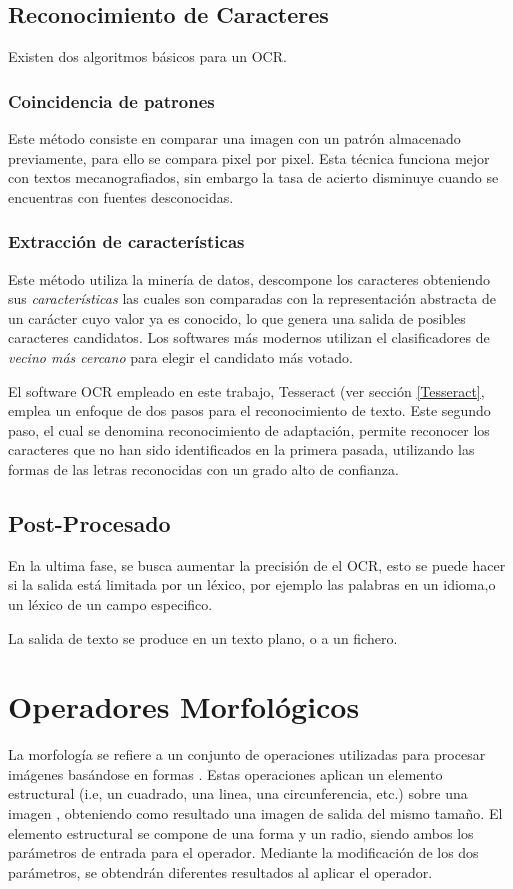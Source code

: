 \subsection{Reconocimiento de Caracteres}

Existen dos algoritmos básicos para un OCR.

\subsubsection{Coincidencia de patrones}
Este método consiste en comparar una imagen con un patrón almacenado previamente, para ello se compara pixel por pixel.
Esta técnica funciona mejor con textos mecanografiados, sin embargo la tasa de acierto disminuye  cuando se encuentras con fuentes desconocidas.
\subsubsection{Extracción de características}
Este método utiliza la minería de datos, descompone los caracteres obteniendo sus \textit{características} las cuales son comparadas con la representación abstracta de un carácter cuyo valor ya es conocido, lo que genera una salida de posibles  caracteres candidatos.
Los softwares más modernos utilizan el clasificadores de \textit{vecino más cercano} para elegir el candidato más votado.

El software OCR empleado en este trabajo, Tesseract (ver sección \ref{Tesseract}, emplea un enfoque de dos pasos para el reconocimiento de texto.
Este segundo paso, el cual se denomina reconocimiento de adaptación, permite reconocer los caracteres que no han sido identificados en la primera pasada, utilizando las formas de las letras reconocidas con un grado alto de confianza.

\subsection{Post-Procesado} 
En la ultima fase, se busca aumentar la precisión de el OCR, esto se puede hacer si la salida está limitada por un léxico, por ejemplo las palabras en un idioma,o un léxico de un campo especifico.

La salida de texto se produce en un texto plano, o a un fichero.

\section{Operadores Morfológicos}
La morfología se refiere a un conjunto de operaciones utilizadas para procesar imágenes basándose en formas \cite{OperadoresMorfologicos}. Estas operaciones aplican un elemento estructural (i.e, un cuadrado, una linea, una circunferencia, etc.) sobre una imagen , obteniendo como resultado una imagen de salida del mismo tamaño.
El elemento estructural se compone de una forma y un radio, siendo ambos los parámetros de entrada para el operador. Mediante la modificación de los dos parámetros, se obtendrán diferentes resultados al aplicar el operador.

